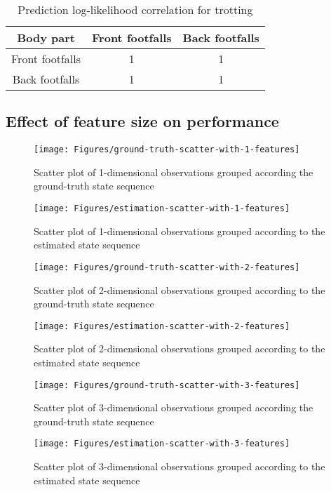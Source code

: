 \begin{table}[h!] 
	\centering
	\begin{tabular}{ |c|c|c|} 	
		\hline	
		\textbf{Body part} & \textbf{Front footfalls} &  \textbf{Back footfalls}\\ 
		\hline
		Front footfalls & 1 & 1\\ 
		\hline
		Back footfalls & 1 & 1\\ 
		\hline	   	
	\end{tabular}
	\caption{Prediction log-likelihood correlation for trotting}
	\label{tab:front-back-trot-log-corr}
\end{table}

\subsection{Effect of feature size on performance}
\begin{figure}[ht!]
	\texttt{[image: Figures/ground-truth-scatter-with-1-features]}
	\caption{Scatter plot of  1-dimensional observations grouped according the ground-truth state sequence}
	\label{fig:gt-1dim}
\end{figure}
\begin{figure}[ht!]
	\texttt{[image: Figures/estimation-scatter-with-1-features]}
	\caption{Scatter plot of 1-dimensional observations grouped according to the estimated state sequence}
	\label{fig:es-1dim}
\end{figure}

\begin{figure}[ht!]
	\texttt{[image: Figures/ground-truth-scatter-with-2-features]}
	\caption{Scatter plot of 2-dimensional observations grouped according to the ground-truth state sequence}
	\label{fig:gt-2dim}
\end{figure}

\begin{figure}[ht!]
	\texttt{[image: Figures/estimation-scatter-with-2-features]}
	\caption{Scatter plot of 2-dimensional observations grouped according to the estimated state sequence}
	\label{fig:es-2dim}
\end{figure}

\begin{figure}[ht!]
	\texttt{[image: Figures/ground-truth-scatter-with-3-features]}
	\caption{Scatter plot of  3-dimensional observations grouped according the ground-truth state sequence}
	\label{fig:gt-3dim}
\end{figure}
\begin{figure}[ht!]
	\texttt{[image: Figures/estimation-scatter-with-3-features]}
	\caption{Scatter plot of 3-dimensional observations grouped according to the estimated state sequence}
	\label{fig:es-3dim}
\end{figure}

